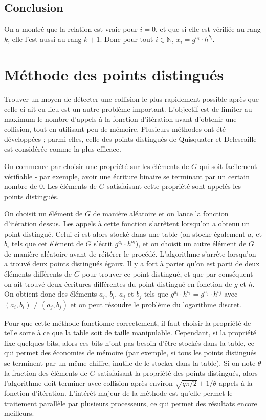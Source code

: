         \subsection*{Conclusion}
        On a montré que la relation est vraie pour $i = 0$, et que si elle est vérifiée au rang $k$, elle l'est aussi au rang $k + 1$. Donc pour tout $i \in \mathbb{N}$, $x_i = g^{a_i} \cdot h^{b_i}$.

        \section{Méthode des points distingués}
        Trouver un moyen de détecter une collision le plus rapidement possible après que celle-ci ait eu lieu est un autre problème important. L'objectif est de limiter au maximum le nombre d'appels à la fonction d'itération avant d'obtenir une collision, tout en utilisant peu de mémoire. Plusieurs méthodes ont été développées ; parmi elles, celle des points distingués de Quisquater et Delescaille est considérée comme la plus efficace.

        On commence par choisir une propriété sur les éléments de $G$ qui soit facilement vérifiable - par exemple, avoir une écriture binaire se terminant par un certain nombre de $0$. Les éléments de $G$ satisfaisant cette propriété sont appelés les points distingués.

        On choisit un élément de $G$ de manière aléatoire et on lance la fonction d'itération dessus. Les appels à cette fonction s'arrêtent lorsqu'on a obtenu un point distingué. Celui-ci est alors stocké dans une table (on stocke également $a_i$ et $b_i$ tels que cet élément de $G$ s'écrit $g^{a_i} \cdot h^{b_i}$), et on choisit un autre élément de $G$ de manière aléatoire avant de réitérer le procédé. L'algorithme s'arrête lorsqu'on a trouvé deux points distingués égaux. Il y a fort à parier qu'on est parti de deux éléments différents de $G$ pour trouver ce point distingué, et que par conséquent on ait trouvé deux écritures différentes du point distingué en fonction de $g$ et $h$. On obtient donc des éléments $a_i$, $b_i$, $a_j$ et $b_j$ tels que $g^{a_i} \cdot h^{b_i} = g^{a_j} \cdot h^{b_j}$ avec $(a_i,b_i) \neq (a_j,b_j)$ et on peut résoudre le problème du logarithme discret.

        Pour que cette méthode fonctionne correctement, il faut choisir la propriété de telle sorte à ce que la table soit de taille manipulable. Cependant, si la propriété fixe quelques bits, alors ces bits n'ont pas besoin d'être stockés dans la table, ce qui permet des économies de mémoire (par exemple, si tous les points distingués se terminent par un même chiffre, inutile de le stocker dans la table). Si on note $\theta$ la fraction des éléments de $G$ satisfaisant la propriété des points distingués, alors l'algorithme doit terminer avec collision après environ $\sqrt{q\pi/2} + 1/\theta$ appels à la fonction d'itération. L'intérêt majeur de la méthode est qu'elle permet le traitement parallèle par plusieurs processeurs, ce qui permet des résultats encore meilleurs.
        
